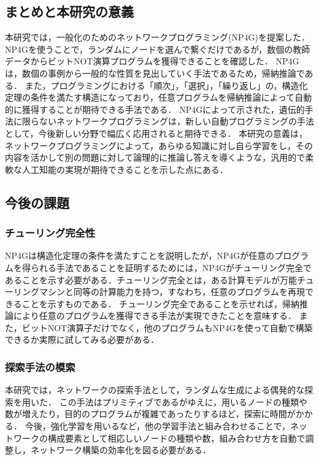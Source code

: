 \documentclass[exploratorypaper]{jsaiart} %
\begin{document}
\subsection{まとめと本研究の意義}
本研究では，一般化のためのネットワークプログラミング(NP4G)を提案した．NP4Gを使うことで，ランダムにノードを選んで繋ぐだけであるが，数個の教師データからビットNOT演算プログラムを獲得できることを確認した．
NP4Gは，数個の事例から一般的な性質を見出していく手法であるため，帰納推論である．
また，プログラミングにおける「順次」，「選択」，「繰り返し」の，構造化定理の条件を満たす構造になっており，任意プログラムを帰納推論によって自動的に獲得することが期待できる手法である．
NP4Gによって示された，遺伝的手法に限らないネットワークプログラミングは，新しい自動プログラミングの手法として，今後新しい分野で幅広く応用されると期待できる．
本研究の意義は，ネットワークプログラミングによって，あらゆる知識に対し自ら学習をし，その内容を活かして別の問題に対して論理的に推論し答えを導くような，汎用的で柔軟な人工知能の実現が期待できることを示した点にある．

\subsection{今後の課題}
\subsubsection{チューリング完全性}
NP4Gは構造化定理の条件を満たすことを説明したが，NP4Gが任意のプログラムを得られる手法であることを証明するためには，NP4Gがチューリング完全であることを示す必要がある．チューリング完全とは，ある計算モデルが万能チューリングマシンと同等の計算能力を持つ，すなわち，任意のプログラムを再現できることを示すものである．
チューリング完全であることを示せれば，帰納推論により任意のプログラムを獲得できる手法が実現できたことを意味する．
また，ビットNOT演算子だけでなく，他のプログラムもNP4Gを使って自動で構築できるか実際に試してみる必要がある．
\subsubsection{探索手法の模索}
本研究では，ネットワークの探索手法として，ランダムな生成による偶発的な探索を用いた．
この手法はプリミティブであるがゆえに，用いるノードの種類や数が増えたり，目的のプログラムが複雑であったりするほど，探索に時間がかかる．
今後，強化学習を用いるなど，他の学習手法と組み合わせることで，ネットワークの構成要素として相応しいノードの種類や数，組み合わせ方を自動で調整し，ネットワーク構築の効率化を図る必要がある．
\end{document}
